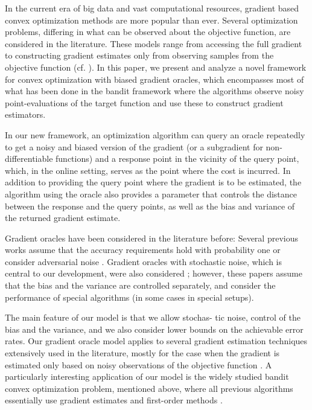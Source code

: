 In the current era of big data and vast computational resources, gradient based convex optimization methods are more popular than ever. Several optimization problems, differing in what can be observed about the objective function, are considered in the literature. These models range from accessing the full gradient to constructing gradient estimates only from observing samples from the objective function (cf. \citealp{nesterov2004introductory,DeGliNe14,HaLe14:SOC,PoTsy90,flaxman2005online,AbHaRa08,AgDeXi10,Ne11:TR,AgFoHsuKaRa13:SIAM,katkul,kushcla,spall1992multivariate,spall1997one,Dip03:AoS,bhatnagar-book,duchi2015optimal}). In this paper, we present and analyze a novel framework for convex optimization with biased gradient oracles, which encompasses most of what has been done in the bandit framework where the algorithms observe noisy point-evaluations of the target function and use these to construct gradient estimators.

In our new framework, an optimization algorithm can query an oracle repeatedly to get a noisy and biased version of the gradient (or a subgradient for non-differentiable functions) and a response point in the vicinity of the query point, which, in the online setting, serves as the point where the cost is incurred. In addition to providing the query point where the gradient is to be estimated, the algorithm using the oracle also provides a parameter that controls the distance between the response and the query points, as well as the bias and variance of the returned gradient estimate. 

Gradient oracles have been considered in the literature before: Several previous works assume that the accuracy requirements hold with probability one \citep{dAsp08,Baes09,DeGliNe14} or consider adversarial noise \citep{SchRoBa11}. Gradient oracles with stochastic noise, which is central to our development, were also considered \citep{JN11a,Hon12,DvoGa15}; however, these papers assume that the bias and the variance are controlled separately, and consider the performance of special algorithms (in some cases in special setups).

The main feature of our model is that we allow stochas- tic noise, control of the bias and the variance, and we also consider lower bounds on the achievable error rates. Our gradient oracle model applies to several gradient estimation techniques extensively used in the literature, mostly for the case when the gradient is estimated only based on noisy observations of the objective function \citep{katkul,kushcla,spall1992multivariate,spall1997one,Dip03:AoS,bhatnagar-book,duchi2015optimal}. A particularly interesting application of our model is the widely studied bandit convex optimization problem,
mentioned above,
where all previous algorithms 
essentially use gradient estimates and first-order methods 
\citep{PoTsy90,flaxman2005online,AbHaRa08,AgDeXi10,Ne11:TR,AgFoHsuKaRa13:SIAM,HaLe14:SOC}.


